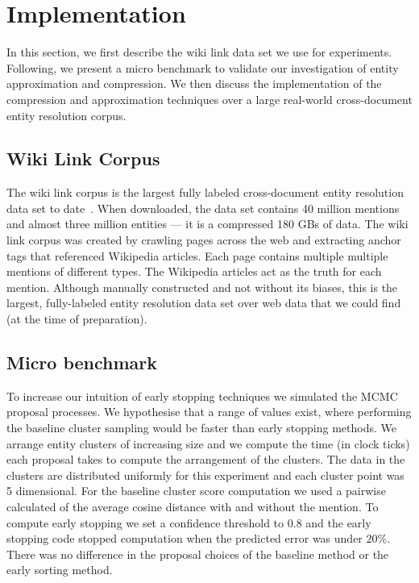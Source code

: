 
\section{Implementation}
\label{sec:optimizer:implementation}

In this section, we first describe the wiki link data set we use for experiments.
Following, we present a micro benchmark to validate our investigation of entity approximation and compression.
We then discuss the implementation of the compression and approximation techniques over a large real-world
cross-document entity resolution corpus.

\subsection{Wiki Link Corpus}
\label{sec:optimizer:wikilinkcorpus}

The wiki link corpus is the largest fully labeled cross-document entity resolution data set to date~\cite{singh12:wiki-links}.
When downloaded, the data set contains 40 million mentions and almost three million entities --- it is a compressed 180 GBs of data.
The wiki link corpus was created by crawling pages across the web and extracting anchor tags that referenced Wikipedia articles.
Each page contains multiple multiple mentions of different types.
The Wikipedia articles act as the truth for each mention.
Although manually constructed and not without its biases, this is the largest,
fully-labeled entity resolution data set over web data that we could find (at the time of preparation).


\subsection{Micro benchmark}
\label{sec:microbenchmark}
To increase our intuition of early stopping techniques we simulated the MCMC proposal processes. 
We hypothesise that a range of values exist, where performing the
baseline cluster sampling would be faster than early stopping methods.
We arrange entity clusters of increasing size and we compute the time (in clock ticks)
each proposal takes to compute the arrangement of the clusters.
The data in the clusters are distributed uniformly for this experiment and each cluster point
was 5 dimensional.
For the baseline cluster score computation we used a pairwise calculated of the average cosine distance
with and without the mention.
To compute early stopping we set a confidence threshold to $0.8$ and the early
stopping code stopped computation when the predicted error was under $20\%$.
There was no difference in the proposal choices of the baseline method or the early sorting method. 

